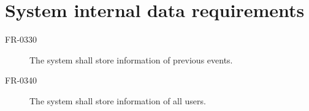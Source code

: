 \section{System internal data requirements}

\begin{description}
\item [FR-0330] The system shall store information of previous events.
\item [FR-0340] The system shall store information of all users.
\end{description}